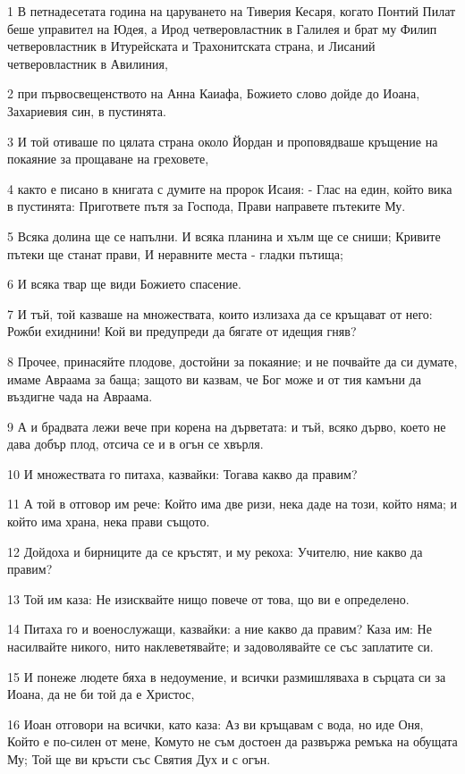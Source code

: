 \par 1 В петнадесетата година на царуването на Тиверия Кесаря, когато Понтий Пилат беше управител на Юдея, а Ирод четверовластник в Галилея и брат му Филип четверовластник в Итурейската и Трахонитската страна, и Лисаний четверовластник в Авилиния,
\par 2 при първосвещенството на Анна Каиафа, Божието слово дойде до Иоана, Захариевия син, в пустинята.
\par 3 И той отиваше по цялата страна около Йордан и проповядваше кръщение на покаяние за прощаване на греховете,
\par 4 както е писано в книгата с думите на пророк Исаия: - Глас на един, който вика в пустинята: Пригответе пътя за Господа, Прави направете пътеките Му.
\par 5 Всяка долина ще се напълни. И всяка планина и хълм ще се сниши; Кривите пътеки ще станат прави, И неравните места - гладки пътища;
\par 6 И всяка твар ще види Божието спасение.
\par 7 И тъй, той казваше на множествата, които излизаха да се кръщават от него: Рожби ехиднини! Кой ви предупреди да бягате от идещия гняв?
\par 8 Прочее, принасяйте плодове, достойни за покаяние; и не почвайте да си думате, имаме Авраама за баща; защото ви казвам, че Бог може и от тия камъни да въздигне чада на Авраама.
\par 9 А и брадвата лежи вече при корена на дърветата: и тъй, всяко дърво, което не дава добър плод, отсича се и в огън се хвърля.
\par 10 И множествата го питаха, казвайки: Тогава какво да правим?
\par 11 А той в отговор им рече: Който има две ризи, нека даде на този, който няма; и който има храна, нека прави същото.
\par 12 Дойдоха и бирниците да се кръстят, и му рекоха: Учителю, ние какво да правим?
\par 13 Той им каза: Не изисквайте нищо повече от това, що ви е определено.
\par 14 Питаха го и военослужащи, казвайки: а ние какво да правим? Каза им: Не насилвайте никого, нито наклеветявайте; и задоволявайте се със заплатите си.
\par 15 И понеже людете бяха в недоумение, и всички размишляваха в сърцата си за Иоана, да не би той да е Христос,
\par 16 Иоан отговори на всички, като каза: Аз ви кръщавам с вода, но иде Оня, Който е по-силен от мене, Комуто не съм достоен да развържа ремъка на обущата Му; Той ще ви кръсти със Святия Дух и с огън.
